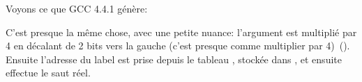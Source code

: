 

\label{switch_lot_GCC}

Voyons ce que GCC 4.4.1 génère:




C'est presque la même chose, avec une petite nuance: l'argument  est multiplié
par 4 en décalant de 2 bits vers la gauche (c'est presque comme multiplier par 4)~().
Ensuite l'adresse du label est prise depuis le tableau , stockée
dans \EAX, et ensuite  effectue le saut réel.

